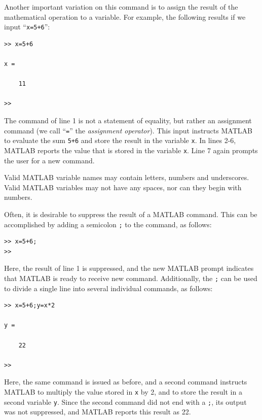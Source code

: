 Another important variation on this command is to assign the result of the mathematical operation to a variable. For example, the following results if we input ``\verb!x=5+6!'':
\begin{lstlisting}[style=Matlab-editor, label={MATLABCalculator02}, caption={The result of the previoius simple addition in MATLAB (see Listing \ref{MATLABCalculator02}) is stored in variable \texttt{x}.}]
>> x=5+6

x =

    11

>> 
\end{lstlisting}
The command of line 1 is not a statement of equality, but rather an assignment command (we call ``\texttt{=}'' the \textit{assignment operator}). This input instructs MATLAB to evaluate the sum \verb!5+6! and store the result in the variable \texttt{x}. In lines 2-6, MATLAB reports the value that is stored in the variable \texttt{x}. Line 7 again prompts the user for a new command.

Valid MATLAB variable names may contain letters, numbers and underscores. Valid MATLAB variables may not have any spaces, nor can they begin with numbers.

Often, it is desirable to suppress the result of a MATLAB command. This can be accomplished by adding a semicolon \texttt{;} to the command, as follows:
\begin{lstlisting}[style=Matlab-editor, label={MATLABCalculator03}, caption={A semicolon (\texttt{;}) may be used at the end of a MATLAB command to suppress the output.}]
>> x=5+6;
>> 
\end{lstlisting}
Here, the result of line 1 is suppressed, and the new MATLAB prompt indicates that MATLAB is ready to receive new command. Additionally, the \texttt{;} can be used to divide a single line into several individual commands, as follows:
\begin{lstlisting}[style=Matlab-editor, label={MATLABCalculator04}, caption={The result of a simple addition calculation is saved in the variable \texttt{x}, which is used for a follow-on calculation.}]
>> x=5+6;y=x*2

y =

    22

>>
\end{lstlisting}
Here, the same command is issued as before, and a second command instructs MATLAB to multiply the value stored in \texttt{x} by 2, and to store the result in a second variable \texttt{y}. Since the second command did not end with a \texttt{;}, its output was not suppressed, and MATLAB reports this result as 22.

